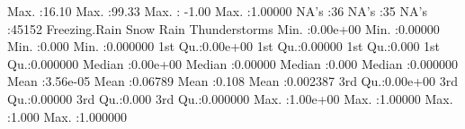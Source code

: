 \documentclass[11pt, a4paper]{article}
\begin{document}
\begin{Schunk}
\begin{Soutput}
 Max.   :16.10   Max.   :99.33   Max.   : -1.00   Max.   :1.00000  
 NA's   :36      NA's   :35      NA's   :45152                     
 Freezing.Rain           Snow              Rain       Thunderstorms     
 Min.   :0.00e+00   Min.   :0.00000   Min.   :0.000   Min.   :0.000000  
 1st Qu.:0.00e+00   1st Qu.:0.00000   1st Qu.:0.000   1st Qu.:0.000000  
 Median :0.00e+00   Median :0.00000   Median :0.000   Median :0.000000  
 Mean   :3.56e-05   Mean   :0.06789   Mean   :0.108   Mean   :0.002387  
 3rd Qu.:0.00e+00   3rd Qu.:0.00000   3rd Qu.:0.000   3rd Qu.:0.000000  
 Max.   :1.00e+00   Max.   :1.00000   Max.   :1.000   Max.   :1.000000  
\end{Soutput}
\end{Schunk}
\end{document}
